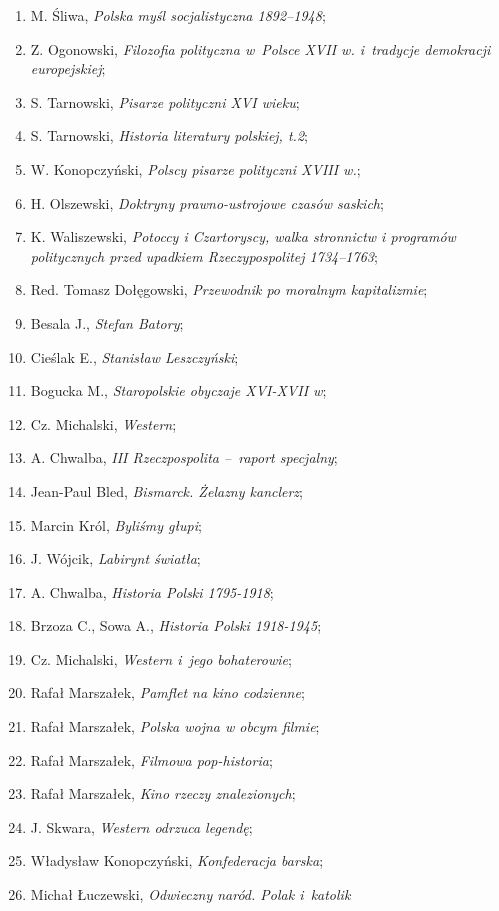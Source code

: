 \documentclass[a4paper,11pt]{article}
\begin{document}
\begin{enumerate}
\item M. Śliwa, \emph{Polska myśl socjalistyczna 1892--1948};
\item Z. Ogonowski, \emph{Filozofia polityczna w~Polsce XVII w.
    i~tradycje demokracji europejskiej};
\item S. Tarnowski, \emph{Pisarze polityczni XVI wieku};
\item S. Tarnowski, \emph{Historia literatury polskiej, t.2};
\item W. Konopczyński, \emph{Polscy pisarze polityczni XVIII w.};
\item H. Olszewski, \emph{Doktryny prawno-ustrojowe czasów saskich};
\item K. Waliszewski, \emph{Potoccy i Czartoryscy, walka stronnictw i
    programów politycznych przed upadkiem Rzeczypospolitej
    1734--1763};
\item Red. Tomasz Dołęgowski, \emph{Przewodnik po moralnym
    kapitalizmie};
\item Besala J., \emph{Stefan Batory};
\item Cieślak E., \emph{Stanisław Leszczyński};
\item Bogucka M., \emph{Staropolskie obyczaje XVI-XVII w};
\item Cz. Michalski, \emph{Western};
\item A. Chwalba, \emph{III Rzeczpospolita --~raport specjalny};
\item Jean-Paul Bled, \emph{Bismarck. Żelazny kanclerz};
\item Marcin Król, \emph{Byliśmy głupi};
\item J. Wójcik, \emph{Labirynt światła};
\item A. Chwalba, \emph{Historia Polski 1795-1918};
\item Brzoza C., Sowa A., \emph{Historia Polski 1918-1945};
\item Cz. Michalski, \emph{Western i~jego bohaterowie};
\item Rafał Marszałek, \emph{Pamflet na kino codzienne};
\item Rafał Marszałek, \emph{Polska wojna w obcym filmie};
\item Rafał Marszałek, \emph{Filmowa pop-historia};
\item Rafał Marszałek, \emph{Kino rzeczy znalezionych};
\item J. Skwara, \emph{Western odrzuca legendę};
\item Władysław Konopczyński, \emph{Konfederacja barska};
\item Michał Łuczewski, \emph{Odwieczny naród. Polak i~katolik
}
\end{enumerate}
\end{document}
